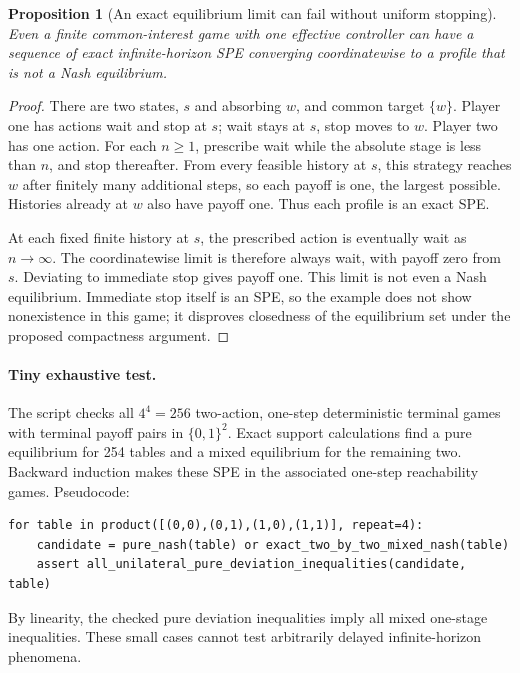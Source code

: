 \documentclass[11pt,a4paper]{article}
\newtheorem{proposition}[theorem]{Proposition}
\theoremstyle{definition}
\theoremstyle{remark}
\begin{document}
\begin{proposition}[An exact equilibrium limit can fail without uniform stopping]
Even a finite common-interest game with one effective controller can have a sequence of exact infinite-horizon SPE converging coordinatewise to a profile that is not a Nash equilibrium.
\end{proposition}
\begin{proof}
There are two states, $s$ and absorbing $w$, and common target $\{w\}$. Player one has actions wait and stop at $s$; wait stays at $s$, stop moves to $w$. Player two has one action. For each $n\geq1$, prescribe wait while the absolute stage is less than $n$, and stop thereafter. From every feasible history at $s$, this strategy reaches $w$ after finitely many additional steps, so each payoff is one, the largest possible. Histories already at $w$ also have payoff one. Thus each profile is an exact SPE.

At each fixed finite history at $s$, the prescribed action is eventually wait as $n\to\infty$. The coordinatewise limit is therefore always wait, with payoff zero from $s$. Deviating to immediate stop gives payoff one. This limit is not even a Nash equilibrium. Immediate stop itself is an SPE, so the example does not show nonexistence in this game; it disproves closedness of the equilibrium set under the proposed compactness argument.
\end{proof}

\paragraph{Tiny exhaustive test.}
The script checks all $4^4=256$ two-action, one-step deterministic terminal games with terminal payoff pairs in $\{0,1\}^2$. Exact support calculations find a pure equilibrium for 254 tables and a mixed equilibrium for the remaining two. Backward induction makes these SPE in the associated one-step reachability games. Pseudocode:
\begin{lstlisting}
for table in product([(0,0),(0,1),(1,0),(1,1)], repeat=4):
    candidate = pure_nash(table) or exact_two_by_two_mixed_nash(table)
    assert all_unilateral_pure_deviation_inequalities(candidate, table)
\end{lstlisting}
By linearity, the checked pure deviation inequalities imply all mixed one-stage inequalities. These small cases cannot test arbitrarily delayed infinite-horizon phenomena.
\end{document}
